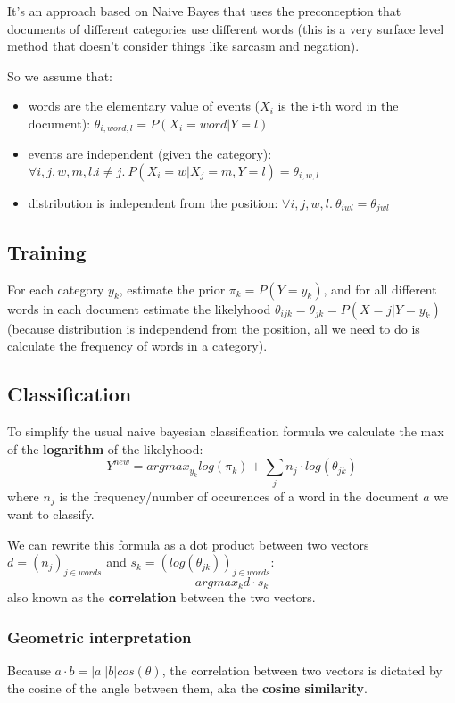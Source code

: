 It's an approach based on Naive Bayes that uses the preconception that documents of different categories use different words (this is a very surface level method that doesn't consider things like sarcasm and negation).

So we assume that:
\begin{itemize}
\item words are the elementary value of events ($ X_i $ is the i-th word in the document): $ \theta_{i, word, l} = P(X_i = word | Y = l) $
\item events are independent (given the category): $ \forall i,j,w,m,l. i \neq j.\  P(X_i = w | X_j = m, Y = l) = \theta_{i,w,l} $
  \item distribution is independent from the position: $ \forall i,j,w,l. \ \theta_{iwl} = \theta_{jwl} $
\end{itemize}

\subsection{Training}
For each category $ y_k $, estimate the prior $ \pi_k = P(Y = y_k) $, and for all different words in each document estimate the likelyhood $ \theta_{ijk} = \theta_{jk} = P(X = j | Y = y_k) $ (because distribution is independend from the position, all we need to do is calculate the frequency of words in a category).

\subsection{Classification}
To simplify the usual naive bayesian classification formula we calculate the max of the \textbf{logarithm} of the likelyhood:
\[
  Y^{new} = arg max_{y_k} log(\pi_k) + \sum_{j} n_j \cdot log(\theta_{jk})
\]
where $ n_j $ is the frequency/number of occurences of a word in the document $ a $ we want to classify.


We can rewrite this formula as a dot product between two vectors $ d = (n_j)_{j \in words} $ and $ s_k = (log(\theta_{jk}))_{j \in words} $:
\[
arg max_k d \cdot s_k
\]
also known as the \textbf{correlation} between the two vectors.

\subsubsection{Geometric interpretation}
Because $ a \cdot b = |a||b|cos(\theta) $, the correlation between two vectors is dictated by the cosine of the angle between them, aka the \textbf{cosine similarity}.

